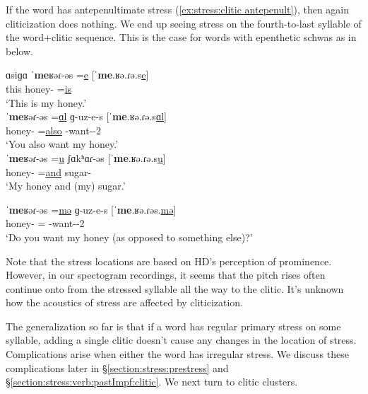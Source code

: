 If the word has antepenultimate stress (\ref{ex:stress:clitic antepenult}), then again cliticization does nothing. We end up seeing stress on the fourth-to-last syllable of the word+clitic sequence.  This is the case for words with epenthetic schwas as in below. 

\begin{exe}
	\ex \label{ex:stress:clitic antepenult}
	
	
	\begin{xlist}
		\ex \gll   ɑsiɡɑ ˈ\textbf{me}ʁəɾ-əs =\underline{e} [ˈ\textbf{me}.ʁə.ɾə.s\underline{e}]   \\
		this honey-{\possFsg} =\underline{is}  
		\\
		\trans `This is my honey.'
		\\
		\ex \gll   ˈ\textbf{me}ʁəɾ-əs =\underline{ɑl} ɡ-uz-e-s [ˈ\textbf{me}.ʁə.ɾə.s\underline{ɑl}]   \\
		honey-{\possFsg} =\underline{also}  {\ind}-want-{\thgloss}-2{\sg} 
		\\
		\trans `You also want my honey.' 
		\\
		\ex \gll   ˈ\textbf{me}ʁəɾ-əs =\underline{u} ʃɑkʰɑɾ-əs [ˈ\textbf{me}.ʁə.ɾə.s\underline{u}]   \\
		honey-{\possFsg} =\underline{and}  sugar-{\possFsg} 
		\\
		\trans `My honey and (my) sugar.' 
		\\
		
		\ex \gll   ˈ\textbf{me}ʁəɾ-əs =\underline{mə} ɡ-uz-e-s [ˈ\textbf{me}.ʁə.ɾəs.\underline{mə}]   \\
		honey-{\possFsg} =\underline{{\q}} {\ind}-want-{\thgloss}-2{\sg} 
		\\
		\trans `Do you want my honey (as opposed to something else)?' 
		\\
		
		
	\end{xlist}
	
\end{exe}


Note that the stress locations are based on HD's perception of prominence. However, in our spectogram recordings, it seems that the pitch rises often continue onto from the stressed syllable all the way to the clitic. It's unknown how the acoustics of stress are affected by cliticization.  

The generalization so far is that if a word has regular primary stress on some syllable, adding a single clitic doesn't cause any changes in the location of stress. Complications arise when either  the word has irregular stress. We discuss these complications later in \S\ref{section:stress:prestress} and \S\ref{section:stress:verb:pastImpf:clitic}. We next turn to clitic clusters.  

